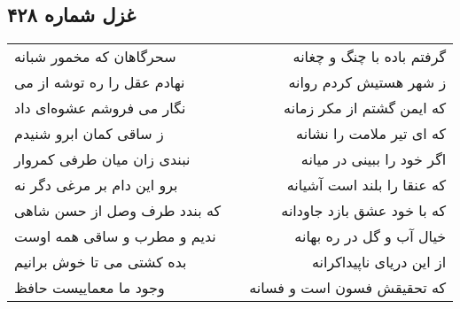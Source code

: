 \begin{center}
\section*{غزل شماره ۴۲۸}
\label{sec:sh428}
\begin{longtable}{l p{0.5cm} r}
سحرگاهان که مخمور شبانه
&&
گرفتم باده با چنگ و چغانه
\\
نهادم عقل را ره توشه از می
&&
ز شهر هستیش کردم روانه
\\
نگار می فروشم عشوه‌ای داد
&&
که ایمن گشتم از مکر زمانه
\\
ز ساقی کمان ابرو شنیدم
&&
که ای تیر ملامت را نشانه
\\
نبندی زان میان طرفی کمروار
&&
اگر خود را ببینی در میانه
\\
برو این دام بر مرغی دگر نه
&&
که عنقا را بلند است آشیانه
\\
که بندد طرف وصل از حسن شاهی
&&
که با خود عشق بازد جاودانه
\\
ندیم و مطرب و ساقی همه اوست
&&
خیال آب و گل در ره بهانه
\\
بده کشتی می تا خوش برانیم
&&
از این دریای ناپیداکرانه
\\
وجود ما معماییست حافظ
&&
که تحقیقش فسون است و فسانه
\\
\end{longtable}
\end{center}

